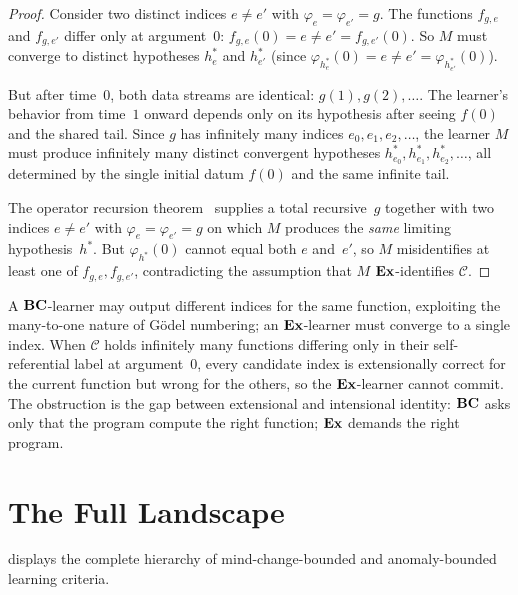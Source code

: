 \begin{proof}
Consider two distinct indices $e \neq e'$ with $\varphi_e = \varphi_{e'} = g$.
The functions $f_{g,e}$ and $f_{g,e'}$ differ only at argument~$0$:
$f_{g,e}(0) = e \neq e' = f_{g,e'}(0)$.  So $M$ must converge to
distinct hypotheses $h_e^*$ and $h_{e'}^*$ (since
$\varphi_{h_e^*}(0) = e \neq e' = \varphi_{h_{e'}^*}(0)$).

But after time~$0$, both data streams are identical: $g(1), g(2), \ldots$.
The learner's behavior from time~$1$ onward depends only on its
hypothesis after seeing $f(0)$ and the shared tail.  Since $g$ has
infinitely many indices $e_0, e_1, e_2, \ldots$, the learner $M$ must
produce infinitely many distinct convergent hypotheses $h_{e_0}^*,
h_{e_1}^*, h_{e_2}^*, \ldots$, all determined by the single initial
datum $f(0)$ and the same infinite tail.

The operator recursion theorem~\cite{CaseSmith1983} supplies a total
recursive~$g$ together with two indices $e \neq e'$ with
$\varphi_e = \varphi_{e'} = g$ on which $M$ produces the \emph{same}
limiting hypothesis~$h^*$.  But $\varphi_{h^*}(0)$ cannot equal both
$e$ and~$e'$, so $M$ misidentifies at least one of $f_{g,e}, f_{g,e'}$,
contradicting the assumption that $M$ $\mathbf{Ex}$-identifies $\mathcal{C}$.
\end{proof}

\begin{separation}
A $\mathbf{BC}$-learner may output different indices for the same function,
exploiting the many-to-one nature of G\"odel numbering; an $\mathbf{Ex}$-learner
must converge to a single index.  When $\mathcal{C}$ holds infinitely many
functions differing only in their self-referential label at argument~$0$,
every candidate index is extensionally correct for the current function
but wrong for the others, so the $\mathbf{Ex}$-learner cannot commit.  The
obstruction is the gap between extensional and intensional identity:
$\mathbf{BC}$ asks only that the program compute the right function; $\mathbf{Ex}$
demands the right program.
\end{separation}



\section{The Full Landscape}
\label{sec:ordinal-landscape}

 displays the complete hierarchy of
mind-change-bounded and anomaly-bounded learning criteria.

